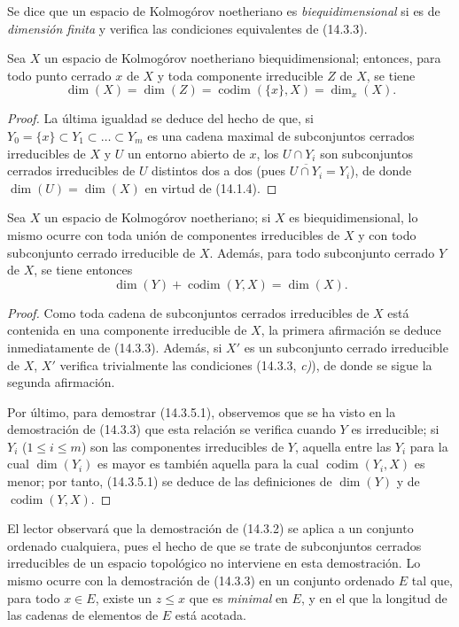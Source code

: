 Se dice que un espacio de Kolmogórov noetheriano es \emph{biequidimensional}
si es de \emph{dimensión finita} y verifica las condiciones equivalentes de
(14.3.3).

\begin{corollary}[14.3.4]
\label{0.14.3.4-es}
Sea $X$ un espacio de Kolmogórov noetheriano biequidimensional; entonces, para
todo punto cerrado $x$ de $X$ y toda componente irreducible $Z$ de $X$, se tiene
\[
  \dim(X)=\dim(Z)=\operatorname{codim}(\{x\},X)=\dim_x(X).
  \tag{14.3.4.1}\label{0.14.3.4.1-es}
\]
\end{corollary}

\begin{proof}
La última igualdad se deduce del hecho de que, si
$Y_0=\{x\}\subset Y_1\subset\ldots\subset Y_m$ es una cadena maximal de
subconjuntos cerrados irreducibles de $X$ y $U$ un entorno abierto de $x$, los
$U\cap Y_i$ son subconjuntos cerrados irreducibles de $U$ distintos dos a dos
(pues $\overline{U\cap Y_i}=Y_i$), de donde
$\dim(U)=\dim(X)$ en virtud de (14.1.4).
\end{proof}

\begin{corollary}[14.3.5]
\label{0.14.3.5-es}
Sea $X$ un espacio de Kolmogórov noetheriano; si $X$ es biequidimensional, lo
mismo ocurre con toda unión de componentes irreducibles de $X$ y con todo
subconjunto cerrado irreducible de $X$. Además, para todo subconjunto cerrado
$Y$ de $X$, se tiene entonces
\[
  \dim(Y)+\operatorname{codim}(Y,X)=\dim(X).
  \tag{14.3.5.1}\label{0.14.3.5.1-es}
\]
\end{corollary}

\begin{proof}
Como toda cadena de subconjuntos cerrados irreducibles de $X$ está contenida en
una componente irreducible de $X$, la primera afirmación se deduce
inmediatamente de (14.3.3). Además, si $X'$ es un subconjunto cerrado
irreducible de $X$, $X'$ verifica trivialmente las condiciones (14.3.3, \emph{c)}), de
donde se sigue la segunda afirmación.

Por último, para demostrar (14.3.5.1), observemos que se ha visto en la
demostración de (14.3.3) que esta relación se verifica cuando $Y$ es
irreducible; si $Y_i$ ($1\leq i\leq m$) son las componentes irreducibles de
$Y$, aquella entre las $Y_i$ para la cual $\dim(Y_i)$ es mayor es también
aquella para la cual $\operatorname{codim}(Y_i,X)$ es menor; por tanto,
(14.3.5.1) se deduce de las definiciones de $\dim(Y)$ y de
$\operatorname{codim}(Y,X)$.
\end{proof}

\begin{remark}[14.3.6]
\label{0.14.3.6-es}
El lector observará que la demostración de (14.3.2) se aplica a un conjunto
ordenado cualquiera, pues el hecho de que se trate de subconjuntos cerrados
irreducibles de un espacio topológico no interviene en esta demostración. Lo
mismo ocurre con la demostración de (14.3.3) en un conjunto ordenado $E$ tal
que, para todo $x\in E$, existe un $z\leq x$ que es \emph{minimal} en $E$, y en
el que la longitud de las cadenas de elementos de $E$ está acotada.
\end{remark}
